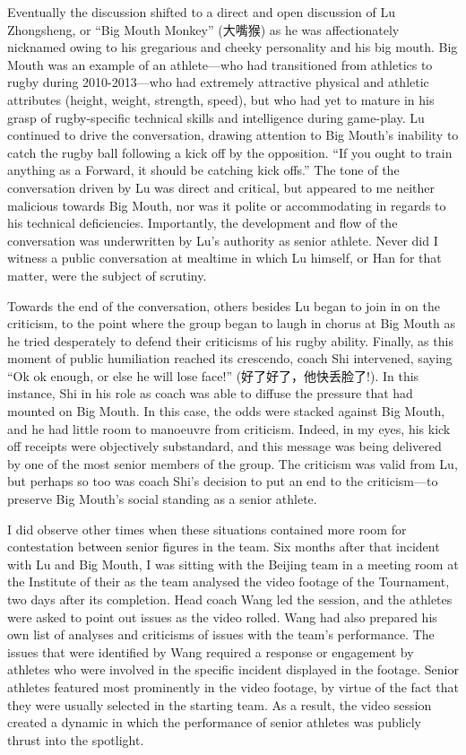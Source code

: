\begin{CJK}{UTF8}{gbsn}
Eventually the discussion shifted to a direct and open discussion of Lu Zhongsheng, or ``Big Mouth Monkey'' (大嘴猴) as he was affectionately nicknamed owing to his gregarious and cheeky personality and his big mouth.  Big Mouth was an example of an athlete---who had transitioned from athletics to rugby during 2010-2013---who had extremely attractive physical and athletic attributes (height, weight, strength, speed), but who had yet to mature in his grasp of rugby-specific technical skills and intelligence during game-play.  Lu continued to drive the conversation, drawing attention to Big Mouth's inability to catch the rugby ball following a kick off by the opposition. ``If you ought to train anything as a Forward, it should be catching kick offs.'' The tone of the conversation driven by Lu was direct and critical, but appeared to me neither malicious towards Big Mouth, nor was it polite or accommodating in regards to his technical deficiencies.  Importantly, the development and flow of the conversation was underwritten by Lu's authority as senior athlete.  Never did I witness a public conversation at mealtime in which Lu himself, or Han for that matter, were the subject of scrutiny.

Towards the end of the conversation, others besides Lu began to join in on the criticism, to the point where the group began to laugh in chorus at Big Mouth as he tried desperately to defend their criticisms of his rugby ability.  Finally, as this moment of public humiliation reached its crescendo, coach Shi intervened, saying ``Ok ok enough, or else he will lose face!'' (好了好了，他快丢脸了!).  In this instance, Shi in his role as coach was able to diffuse the pressure that had mounted on Big Mouth. In this case, the odds were stacked against Big Mouth, and he had little room to manoeuvre from criticism.  Indeed, in my eyes, his kick off receipts were objectively substandard, and this message was being delivered by one of the most senior members of the group. The criticism was valid from Lu, but perhaps so too was coach Shi's decision to put an end to the criticism---to preserve Big Mouth's social standing as a senior athlete.

I did observe other times when these situations contained more room for contestation between senior figures in the team.  Six months after that incident with Lu and Big Mouth, I was sitting with the Beijing team in a meeting room at the Institute of their as the team analysed the video footage of the Tournament, two days after its completion.  Head coach Wang led the session, and the athletes were asked to point out issues as the video rolled.  Wang had also prepared his own list of analyses and criticisms of issues with the team's performance.  The issues that were identified by Wang required a response or engagement by athletes who were involved in the specific incident displayed in the footage.  Senior athletes featured most prominently in the video footage, by virtue of the fact that they were usually selected in the starting team.  As a result, the video session created a dynamic in which the performance of senior athletes was publicly thrust into the spotlight.


\end{CJK}
